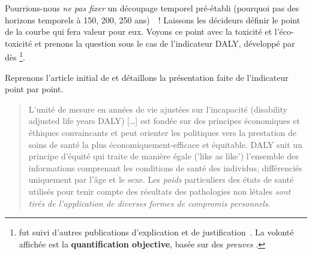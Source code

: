 Pourrions-nous \emph{ne pas fixer} un découpage temporel pré-établi (pourquoi pas des horizons temporels à 150, 200, 250 ans)~~!
Laissons les décideurs définir le point de la courbe qui fera valeur pour eux.
Voyons ce point avec la toxicité et l'éco-toxicité et prenons la question sous le cas de l'indicateur \gls{DALY}, développé par \citeauthor{murray_quantifying_1994} dès \citeyear{murray_quantifying_1994}\footnote{ fut suivi d'autres publications d'explication et de justification~\cite{murray_disability-adjusted_2012,murray_global_1997,murray_evidence-based_1996,murray_quantifying_1994,murray_understanding_1997}. La volonté affichée est la \textbf{quantification objective}, basée sur des \emph{preuves} .}.

Reprenons l'article initial de \citeauthor{murray_quantifying_1994} et détaillons la présentation faite de l'indicateur point par point.
\blockcquote[traduction]{murray_understanding_1997}{
L'unité de mesure en années de vie ajustées sur l'incapacité (disability adjusted life years DALY)
[\dots]
est fondée sur des principes économiques et éthiques convaincants et peut orienter les politiques vers la prestation de soins de santé la plus économiquement-efficace et équitable.
DALY suit un principe d'équité qui traite de manière égale ('like as like') l'ensemble des informations comprenant les conditions de santé des individus, différenciés uniquement par l'âge et le sexe.
Les \emph{poids} particuliers des états de santé utilisés pour tenir compte des résultats des pathologies non létales \emph{sont tirés de l'application de diverses formes de compromis personnels.}
}

